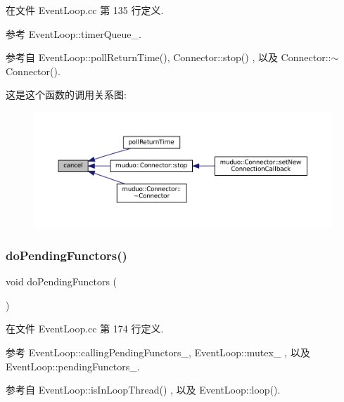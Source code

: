 在文件 Event\+Loop.\+cc 第 135 行定义.



参考 Event\+Loop\+::timer\+Queue\+\_\+.



参考自 Event\+Loop\+::poll\+Return\+Time(), Connector\+::stop() , 以及 Connector\+::$\sim$\+Connector().

这是这个函数的调用关系图\+:
\nopagebreak
\begin{figure}[H]
\begin{center}
\leavevmode
\includegraphics[width=350pt]{classmuduo_1_1EventLoop_af8b24b02bbff6a657fa5b0190bef9b9b_icgraph}
\end{center}
\end{figure}
\mbox{\label{classmuduo_1_1EventLoop_a52b9d01f6df5ea016514b924abda1299}} 
\subsubsection{\texorpdfstring{do\+Pending\+Functors()}{doPendingFunctors()}}
{\footnotesize\ttfamily void do\+Pending\+Functors (\begin{DoxyParamCaption}{ }\end{DoxyParamCaption})\hspace{0.3cm}{\ttfamily [private]}}



在文件 Event\+Loop.\+cc 第 174 行定义.



参考 Event\+Loop\+::calling\+Pending\+Functors\+\_\+, Event\+Loop\+::mutex\+\_\+ , 以及 Event\+Loop\+::pending\+Functors\+\_\+.



参考自 Event\+Loop\+::is\+In\+Loop\+Thread() , 以及 Event\+Loop\+::loop().


